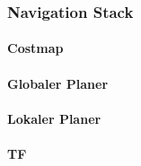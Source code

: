\subsubsection{Navigation Stack}
\label{subsubsec:02navigatinStack}

\paragraph{Costmap}
\paragraph{Globaler Planer}
\paragraph{Lokaler Planer}
\paragraph{TF}